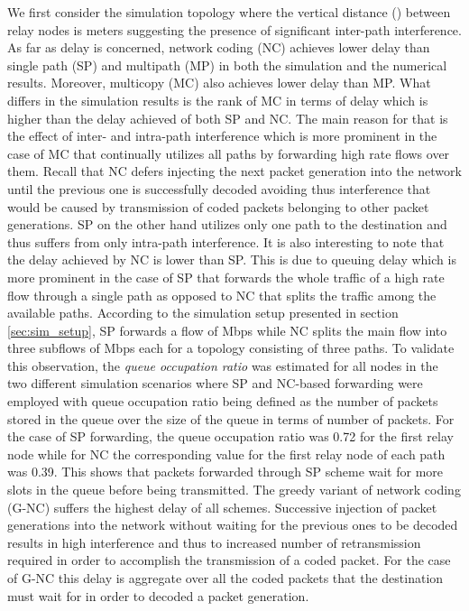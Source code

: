 \documentclass[journal, onecolumn, 12pt]{IEEEtran}
\begin{document}
We first consider the simulation topology where the vertical distance () between relay nodes is  meters suggesting the presence of significant inter-path interference.
As far as delay is concerned, network coding (NC) achieves lower delay than single path (SP) and multipath (MP) in both the simulation and the numerical results.
Moreover, multicopy (MC) also achieves lower delay than MP.
What differs in the simulation results is the rank of MC in terms of delay which is higher than the delay achieved of both SP and NC.
The main reason for that is the effect of inter- and intra-path interference which is more prominent in the case of MC that continually utilizes all paths by forwarding high rate flows over them.
Recall that NC defers injecting the next packet generation into the network until the previous one is successfully decoded avoiding thus interference that would be caused by
transmission of coded packets belonging to other packet generations.
SP on the other hand utilizes only one path to the destination and thus suffers from only intra-path interference.
It is also interesting to note that the delay achieved by NC is lower than SP.
This is due to queuing delay which is more prominent in the case of SP that forwards the whole traffic of a high rate flow through a single path as opposed to NC that splits the traffic among the available paths.
According to the simulation setup presented in section \ref{sec:sim_setup}, SP forwards a flow of  Mbps while NC splits the main flow into three subflows of  Mbps each for a topology consisting of three paths.
To validate this observation, the \textit{queue occupation ratio} was estimated for all nodes in the two different simulation scenarios where SP and NC-based forwarding were employed
with queue occupation ratio being defined as the number of packets stored in the queue over the size of the queue in terms of number of packets.
For the case of SP forwarding, the queue occupation ratio was 0.72 for the first relay node while for NC the corresponding value for the first relay node of each path was 0.39.
This shows that packets forwarded through SP scheme wait for more slots in the queue before being transmitted.
The greedy variant of network coding (G-NC) suffers the highest delay of all schemes.
Successive injection of packet generations into the network without waiting for the previous ones to be decoded results in high interference and thus to increased number of retransmission required in order
to accomplish the transmission of a coded packet.
For the case of G-NC this delay is aggregate over all the coded packets that the destination must wait for in order to decoded a packet generation.
\end{document}
